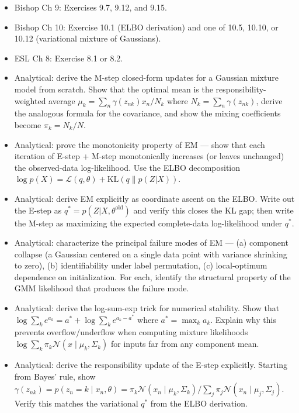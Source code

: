 \begin{itemize}
\tightlist
\item
  Bishop Ch 9: Exercises 9.7, 9.12, and 9.15.
\item
  Bishop Ch 10: Exercise 10.1 (ELBO derivation) and one of 10.5, 10.10,
  or 10.12 (variational mixture of Gaussians).
\item
  ESL Ch 8: Exercise 8.1 or 8.2.
\item
  Analytical: derive the M-step closed-form updates for a Gaussian
  mixture model from scratch. Show that the optimal mean is the
  responsibility-weighted average
  \(\mu_k = \sum_n \gamma(z_{nk}) x_n / N_k\) where
  \(N_k = \sum_n \gamma(z_{nk})\), derive the analogous formula for the
  covariance, and show the mixing coefficients become
  \(\pi_k = N_k / N\).
\item
  Analytical: prove the monotonicity property of EM --- show that each
  iteration of E-step + M-step monotonically increases (or leaves
  unchanged) the observed-data log-likelihood. Use the ELBO
  decomposition
  \(\log p(X) = \mathcal{L}(q, \theta) + \text{KL}(q \| p(Z|X))\).
\item
  Analytical: derive EM explicitly as coordinate ascent on the ELBO.
  Write out the E-step as \(q^* = p(Z | X, \theta^{\text{old}})\) and
  verify this closes the KL gap; then write the M-step as maximizing the
  expected complete-data log-likelihood under \(q^*\).
\item
  Analytical: characterize the principal failure modes of EM --- (a)
  component collapse (a Gaussian centered on a single data point with
  variance shrinking to zero), (b) identifiability under label
  permutation, (c) local-optimum dependence on initialization. For each,
  identify the structural property of the GMM likelihood that produces
  the failure mode.
\item
  Analytical: derive the log-sum-exp trick for numerical stability. Show
  that \(\log \sum_k e^{a_k} = a^* + \log \sum_k e^{a_k - a^*}\) where
  \(a^* = \max_k a_k\). Explain why this prevents overflow/underflow
  when computing mixture likelihoods
  \(\log \sum_k \pi_k \mathcal{N}(x \mid \mu_k, \Sigma_k)\) for inputs
  far from any component mean.
\item
  Analytical: derive the responsibility update of the E-step explicitly.
  Starting from Bayes' rule, show
  \(\gamma(z_{nk}) = p(z_n = k \mid x_n, \theta) = \pi_k \mathcal{N}(x_n \mid \mu_k, \Sigma_k) / \sum_j \pi_j \mathcal{N}(x_n \mid \mu_j, \Sigma_j)\).
  Verify this matches the variational \(q^*\) from the ELBO derivation.
\end{itemize}

